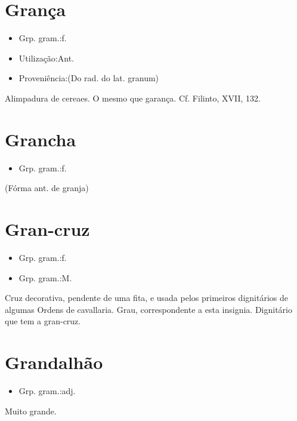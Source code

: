 \section{Grança}
\begin{itemize}
\item {Grp. gram.:f.}
\end{itemize}
\begin{itemize}
\item {Utilização:Ant.}
\end{itemize}
\begin{itemize}
\item {Proveniência:(Do rad. do lat. \textunderscore granum\textunderscore )}
\end{itemize}
Alimpadura de cereaes.
O mesmo que \textunderscore garança\textunderscore . Cf. Filinto, XVII, 132.
\section{Grancha}
\begin{itemize}
\item {Grp. gram.:f.}
\end{itemize}
(Fórma ant. de \textunderscore granja\textunderscore )
\section{Gran-cruz}
\begin{itemize}
\item {Grp. gram.:f.}
\end{itemize}
\begin{itemize}
\item {Grp. gram.:M.}
\end{itemize}
Cruz decorativa, pendente de uma fita, e usada pelos primeiros dignitários de algumas Ordens de cavallaria.
Grau, correspondente a esta insignia.
Dignitário que tem a gran-cruz.
\section{Grandalhão}
\begin{itemize}
\item {Grp. gram.:adj.}
\end{itemize}
Muito grande.
